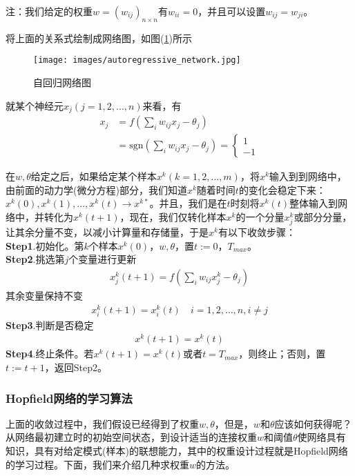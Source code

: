             注：我们给定的权重$w = (w_{ij})_{n\times n}$有$w_{ii} = 0$，并且可以设置$w_{ij} = w_{ji}$。
            \par
            将上面的关系式绘制成网络图，如图(\ref{fig:自回归网络图})所示
            \begin{figure}[H]
            \centering
            \texttt{[image: images/autoregressive\_network.jpg]}
            \caption{自回归网络图}
            \label{fig:自回归网络图}
            \end{figure}
            就某个神经元$x_j(j=1,2,\dots,n)$来看，有
            \begin{align*}
            x_j & = f\left(\sum_i w_{ij}x_j -\theta_j\right)\\
            & =\mathrm{sgn}\left(\sum_i w_{ij}x_j -\theta_j\right) =
            \left\{
            \begin{aligned}
            1\\
            -1
            \end{aligned}
            \right.
            \end{align*}
            \par
            在$w,\theta$给定之后，如果给定某个样本$x^k(k = 1,2,\dots,m)$，将$x^k$输入到到网络中，由前面的动力学(微分方程)部分，我们知道$x^k$随着时间$t$的变化会稳定下来：$x^k(0),x^k(1),\dots,x^k(t)\rightarrow x^{k*}$。并且，我们是在$t$时刻将$x^k(t)$整体输入到网络中，并转化为$x^k(t+1)$，现在，我们仅转化样本$x^k$的一个分量$x_j^k$或部分分量，让其余分量不变，以减小计算量和存储量，于是$x^k$有以下收敛步骤：\\
            \textbf{Step1}.初始化。第$k$个样本$x^k(0)$，$w,\theta$，置$t:=0$，$T_{max}$。\\
            \textbf{Step2}.挑选第$j$个变量进行更新
            \begin{align*}
            x_j^k(t+1) = f \left( \sum_iw_{ij}x^k_j -\theta_j \right)
            \end{align*}
            其余变量保持不变
            \begin{align*}
            x_i^k(t+1) = x_i^k(t) \quad i = 1,2,\dots,n,i\neq j
            \end{align*}
            \textbf{Step3}.判断是否稳定
            \begin{align*}
            x^k(t+1) = x^k(t)
            \end{align*}
            \textbf{Step4}.终止条件。若$x^k(t+1) = x^k(t)$或者$t = T_{max}$，则终止；否则，置$t:= t+1$，返回Step2。
        \subsubsection{Hopfield网络的学习算法}
            \par
            上面的收敛过程中，我们假设已经得到了权重$w,\theta$，但是，$w$和$\theta$应该如何获得呢？从网络最初建立时的初始空间状态，到设计适当的连接权重$w$和阈值$\theta$使网络具有知识，具有对给定模式(样本)的联想能力，其中的权重设计过程就是Hopfield网络的学习过程。下面，我们来介绍几种求权重$w$的方法。
